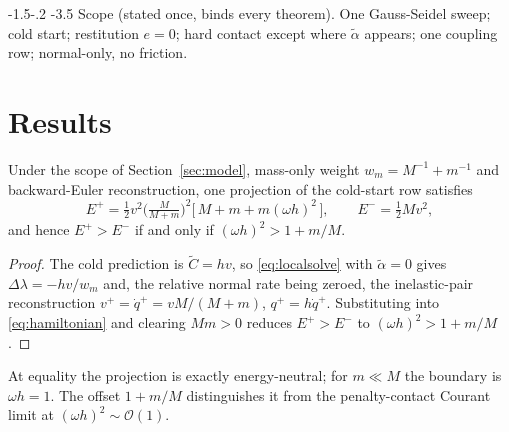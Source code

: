 \documentclass[sigconf,screen,review,anonymous]{acmart}
\makeatletter
\newcommand{\rih}{\def\@toclevel{4}%
  \@startsection{paragraph}{4}{\parindent}%
  {-1.5\p@ \@plus -1\p@ \@minus -.2\p@}%
  {-3.5\p@}%
  {\ACM@NRadjust{\@parfont\@adddotafter}}}
\newcommand{\wm}{w_{m}}
\newcommand{\oh}{\omega h}
\theoremstyle{acmdefinition}
\makeatother
\begin{document}
\rih{Scope (stated once, binds every theorem).} One Gauss-Seidel
sweep; cold start; restitution $e = 0$; hard contact except where $\tilde\alpha$
appears; one coupling row; normal-only, no friction.

\section{Results}
\label{sec:results}

\begin{theorem}
\label{thm:boundary}
Under the scope of Section~\ref{sec:model}, mass-only weight $\wm = M^{-1} +
m^{-1}$ and backward-Euler reconstruction, one projection of the cold-start row
satisfies
\begin{equation}
E^{+} = \tfrac12 v^2 \Big(\tfrac{M}{M+m}\Big)^{\!2}\big[\,M + m + m(\oh)^2\,\big],
\qquad E^{-} = \tfrac12 M v^2,
\label{eq:eplus}
\end{equation}
and hence $E^{+} > E^{-}$ if and only if $(\oh)^2 > 1 + m/M$.
\end{theorem}

\begin{proof}
The cold prediction is $\tilde C = h v$, so \eqref{eq:localsolve} with
$\tilde\alpha = 0$ gives $\Delta\lambda = -h v / \wm$ and, the relative normal
rate being zeroed, the inelastic-pair reconstruction
$v^{+} = \dot q^{+} = v M/(M+m)$, $q^{+} = h\dot q^{+}$. Substituting into
\eqref{eq:hamiltonian} and clearing $Mm > 0$ reduces $E^{+} > E^{-}$ to
$(\oh)^2 > 1 + m/M$.
\end{proof}

At equality the projection is exactly energy-neutral; for $m \ll M$ the boundary
is $\oh = 1$. The offset
$1 + m/M$ distinguishes it from the penalty-contact Courant limit at
$(\oh)^2 \sim \mathcal{O}(1)$.
\end{document}
